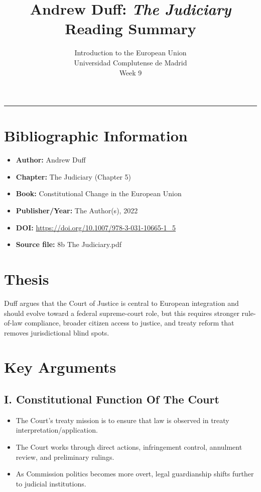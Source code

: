\documentclass[11pt,a4paper]{article}
\begin{document}
\title{Andrew Duff: \textit{The Judiciary}\\Reading Summary}
\author{Introduction to the European Union\\Universidad Complutense de Madrid\\Week 9}
\date{}
\maketitle
\vspace{-1em}
\hrule
\vspace{1em}

\section*{Bibliographic Information}
\begin{itemize}
\item \textbf{Author:} Andrew Duff
\item \textbf{Chapter:} The Judiciary (Chapter 5)
\item \textbf{Book:} Constitutional Change in the European Union
\item \textbf{Publisher/Year:} The Author(s), 2022
\item \textbf{DOI:} \url{https://doi.org/10.1007/978-3-031-10665-1_5}
\item \textbf{Source file:} 8b The Judiciary.pdf
\end{itemize}

\section*{Thesis}
Duff argues that the Court of Justice is central to European integration and should evolve toward a federal supreme-court role, but this requires stronger rule-of-law compliance, broader citizen access to justice, and treaty reform that removes jurisdictional blind spots.

\section*{Key Arguments}
\subsection*{I. Constitutional Function Of The Court}
\begin{itemize}
\item The Court's treaty mission is to ensure that law is observed in treaty interpretation/application.
\item The Court works through direct actions, infringement control, annulment review, and preliminary rulings.
\item As Commission politics becomes more overt, legal guardianship shifts further to judicial institutions.
\end{itemize}
\end{document}
